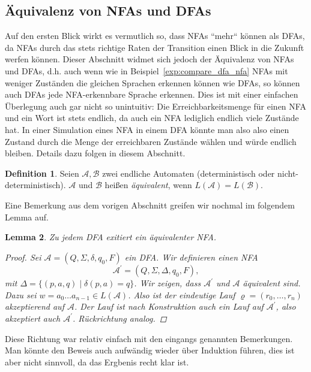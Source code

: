 \documentclass[11pt, a4paper]{article}
\theoremstyle{definition}
\newtheorem{definition}{Definition}[section]
\theoremstyle{plain}
\newtheorem{lemma}[definition]{Lemma}
\numberwithin{equation}{section}
\begin{document}
\subsection{Äquivalenz von NFAs und DFAs}\label{regular_equivalence}
Auf den ersten Blick wirkt es vermutlich so, dass NFAs ``mehr`` können als DFAs, da NFAs durch das stets richtige Raten der Transition einen Blick in die Zukunft werfen können. Dieser Abschnitt widmet sich jedoch der Äquivalenz von NFAs und DFAs, d.h. auch wenn wie in Beispiel~\ref{exp:compare_dfa_nfa} NFAs mit weniger Zuständen die gleichen Sprachen erkennen können wie DFAs, so können auch DFAs jede NFA-erkennbare Sprache erkennen. Dies ist mit einer einfachen Überlegung auch gar nicht so unintuitiv: Die Erreichbarkeitsmenge für einen NFA und ein Wort ist stets endlich, da auch ein NFA lediglich endlich viele Zustände hat. In einer Simulation eines NFA in einem DFA könnte man also also einen Zustand durch die Menge der erreichbaren Zustände wählen und würde endlich bleiben. Details dazu folgen in diesem Abschnitt.
\begin{definition}\label{def:fa_equivalence}
	Seien $\mathcal{A}, \mathcal{B}$ zwei endliche Automaten (deterministisch oder nicht-de\-ter\-mi\-nis\-tisch). $\mathcal{A}$ und $\mathcal{B}$ heißen \textit{äquivalent}, wenn $L(\mathcal{A}) = L(\mathcal{B})$.
\end{definition}
Eine Bemerkung aus dem vorigen Abschnitt greifen wir nochmal im folgendem Lemma auf.
\begin{lemma}\label{lem:dfa2nfa}
	Zu jedem DFA exitiert ein äquivalenter NFA.
	\begin{proof}
		Sei $\mathcal{A} = (Q, \Sigma, \delta, q_0, F)$ ein DFA. Wir definieren einen NFA
		$$
			\mathcal{A}^\prime = (Q, \Sigma, \Delta, q_0, F),
		$$
		mit $\Delta = \{ (p, a, q) \mid \delta(p, a) = q \}$. Wir zeigen, dass $\mathcal{A}^\prime$ und $\mathcal{A}$ äquivalent sind. Dazu sei $w = a_0 \ldots a_{n-1} \in L(\mathcal{A})$. Also ist der eindeutige Lauf $\varrho = (r_0, \ldots, r_n)$ akzeptierend auf $\mathcal{A}$. Der Lauf ist nach Konstruktion auch ein Lauf auf $\mathcal{A}^\prime$, also akzeptiert auch $\mathcal{A}^\prime$. Rückrichtung analog.
	\end{proof}
\end{lemma}
Diese Richtung war relativ einfach mit den eingangs genannten Bemerkungen. Man könnte den Beweis auch aufwändig wieder über Induktion führen, dies ist aber nicht sinnvoll, da das Ergbenis recht klar ist.
\end{document}

